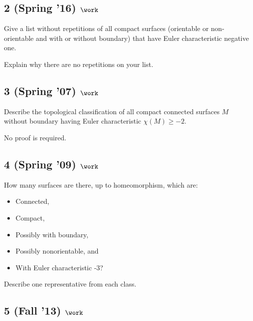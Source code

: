 \hypertarget{spring-16-work-2}{%
\subsection{\texorpdfstring{2 (Spring '16)
\(\work\)}{2 (Spring '16) \textbackslash work}}\label{spring-16-work-2}}

Give a list without repetitions of all compact surfaces (orientable or
non-orientable and with or without boundary) that have Euler
characteristic negative one.

Explain why there are no repetitions on your list.

\hypertarget{spring-07-work-3}{%
\subsection{\texorpdfstring{3 (Spring '07)
\(\work\)}{3 (Spring '07) \textbackslash work}}\label{spring-07-work-3}}

Describe the topological classification of all compact connected
surfaces \(M\) without boundary having Euler characteristic
\(\chi(M )\geq -2\).

No proof is required.

\hypertarget{spring-09-work-6}{%
\subsection{\texorpdfstring{4 (Spring '09)
\(\work\)}{4 (Spring '09) \textbackslash work}}\label{spring-09-work-6}}

How many surfaces are there, up to homeomorphism, which are:

\begin{itemize}
\tightlist
\item
  Connected,
\item
  Compact,
\item
  Possibly with boundary,
\item
  Possibly nonorientable, and
\item
  With Euler characteristic -3?
\end{itemize}

Describe one representative from each class.

\hypertarget{fall-13-work}{%
\subsection{\texorpdfstring{5 (Fall '13)
\(\work\)}{5 (Fall '13) \textbackslash work}}\label{fall-13-work}}

